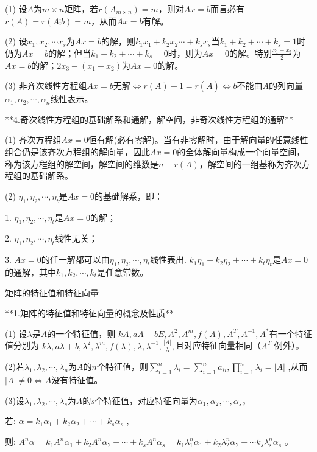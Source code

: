 (1) 设$A$为$m \times n$矩阵，若$r(A_{m \times n}) = m$，则对$Ax =b$而言必有$r(A) = r(A \vdots b) = m$，从而$Ax = b$有解。

(2) 设$x_{1},x_{2},\cdots x_{s}$为$Ax = b$的解，则$k_{1}x_{1} + k_{2}x_{2}\cdots + k_{s}x_{s}$当$k_{1} + k_{2} + \cdots + k_{s} = 1$时仍为$Ax =b$的解；但当$k_{1} + k_{2} + \cdots + k_{s} = 0$时，则为$Ax =0$的解。特别$\frac{x_{1} + x_{2}}{2}$为$Ax = b$的解；$2x_{3} - (x_{1} +x_{2})$为$Ax = 0$的解。

(3) 非齐次线性方程组${Ax} = b$无解$\Leftrightarrow r(A) + 1 =r(\overline{A}) \Leftrightarrow b$不能由$A$的列向量$\alpha_{1},\alpha_{2},\cdots,\alpha_{n}$线性表示。

**4.奇次线性方程组的基础解系和通解，解空间，非奇次线性方程组的通解**

(1) 齐次方程组${Ax} = 0$恒有解(必有零解)。当有非零解时，由于解向量的任意线性组合仍是该齐次方程组的解向量，因此${Ax}= 0$的全体解向量构成一个向量空间，称为该方程组的解空间，解空间的维数是$n - r(A)$，解空间的一组基称为齐次方程组的基础解系。

(2) $\eta_{1},\eta_{2},\cdots,\eta_{t}$是${Ax} = 0$的基础解系，即：

1. $\eta_{1},\eta_{2},\cdots,\eta_{t}$是${Ax} = 0$的解；

2. $\eta_{1},\eta_{2},\cdots,\eta_{t}$线性无关；

3. ${Ax} = 0$的任一解都可以由$\eta_{1},\eta_{2},\cdots,\eta_{t}$线性表出.
$k_{1}\eta_{1} + k_{2}\eta_{2} + \cdots + k_{t}\eta_{t}$是${Ax} = 0$的通解，其中$k_{1},k_{2},\cdots,k_{t}$是任意常数。

矩阵的特征值和特征向量

**1.矩阵的特征值和特征向量的概念及性质**

(1) 设$\lambda$是$A$的一个特征值，则 ${kA},{aA} + {bE},A^{2},A^{m},f(A),A^{T},A^{- 1},A^{*}$有一个特征值分别为
${kλ},{aλ} + b,\lambda^{2},\lambda^{m},f(\lambda),\lambda,\lambda^{- 1},\frac{|A|}{\lambda},$且对应特征向量相同（$A^{T}$ 例外）。

(2)若$\lambda_{1},\lambda_{2},\cdots,\lambda_{n}$为$A$的$n$个特征值，则$\sum_{i= 1}^{n}\lambda_{i} = \sum_{i = 1}^{n}a_{{ii}},\prod_{i = 1}^{n}\lambda_{i}= |A|$ ,从而$|A| \neq 0 \Leftrightarrow A$没有特征值。

(3)设$\lambda_{1},\lambda_{2},\cdots,\lambda_{s}$为$A$的$s$个特征值，对应特征向量为$\alpha_{1},\alpha_{2},\cdots,\alpha_{s}$，

若: $\alpha = k_{1}\alpha_{1} + k_{2}\alpha_{2} + \cdots + k_{s}\alpha_{s}$ ,

则: $A^{n}\alpha = k_{1}A^{n}\alpha_{1} + k_{2}A^{n}\alpha_{2} + \cdots +k_{s}A^{n}\alpha_{s} = k_{1}\lambda_{1}^{n}\alpha_{1} +k_{2}\lambda_{2}^{n}\alpha_{2} + \cdots k_{s}\lambda_{s}^{n}\alpha_{s}$ 。

